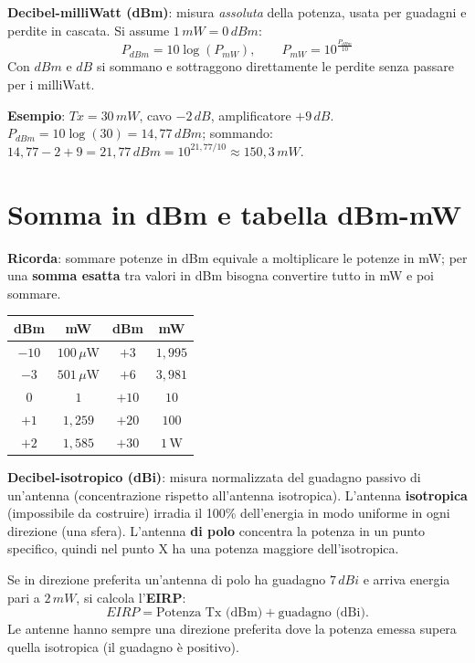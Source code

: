 \documentclass[11pt,a4paper]{report}
\newcommand{\pagemark}[1]{\marginpar{\footnotesize\color{gray}p.#1}}
\begin{document}
\textbf{Decibel-milliWatt (dBm)}: misura \emph{assoluta} della potenza, usata per guadagni e perdite in cascata. Si assume $1\,mW = 0\,dBm$:
\[ P_{dBm} = 10\log(P_{mW}), \qquad P_{mW} = 10^{\frac{P_{dBm}}{10}} \]
Con $dBm$ e $dB$ si sommano e sottraggono direttamente le perdite senza passare per i milliWatt.

\textbf{Esempio}: $Tx = 30\,mW$, cavo $-2\,dB$, amplificatore $+9\,dB$. $P_{dBm} = 10\log(30) = 14{,}77\,dBm$; sommando: $14{,}77 - 2 + 9 = 21{,}77\,dBm = 10^{21{,}77/10} \approx 150{,}3\,mW$.

\section{Somma in dBm e tabella dBm-mW}\pagemark{60}
\textbf{Ricorda}: sommare potenze in dBm equivale a moltiplicare le potenze in mW; per una \textbf{somma esatta} tra valori in dBm bisogna convertire tutto in mW e poi sommare.

\begin{center}\footnotesize
\begin{tabular}{cc|cc}
\textbf{dBm} & \textbf{mW} & \textbf{dBm} & \textbf{mW}\\\hline
$-10$ & $100\,\mu$W & $+3$ & $1{,}995$\\
$-3$ & $501\,\mu$W & $+6$ & $3{,}981$\\
$0$ & $1$ & $+10$ & $10$\\
$+1$ & $1{,}259$ & $+20$ & $100$\\
$+2$ & $1{,}585$ & $+30$ & $1\,$W\\
\end{tabular}
\end{center}

\textbf{Decibel-isotropico (dBi)}: misura normalizzata del guadagno passivo di un'antenna (concentrazione rispetto all'antenna isotropica). L'antenna \textbf{isotropica} (impossibile da costruire) irradia il 100\% dell'energia in modo uniforme in ogni direzione (una sfera). L'antenna \textbf{di polo} concentra la potenza in un punto specifico, quindi nel punto X ha una potenza maggiore dell'isotropica.

Se in direzione preferita un'antenna di polo ha guadagno $7\,dBi$ e arriva energia pari a $2\,mW$, si calcola l'\textbf{EIRP}:
\[ EIRP = \text{Potenza Tx (dBm)} + \text{guadagno (dBi)}. \]
Le antenne hanno sempre una direzione preferita dove la potenza emessa supera quella isotropica (il guadagno è positivo).
\end{document}
